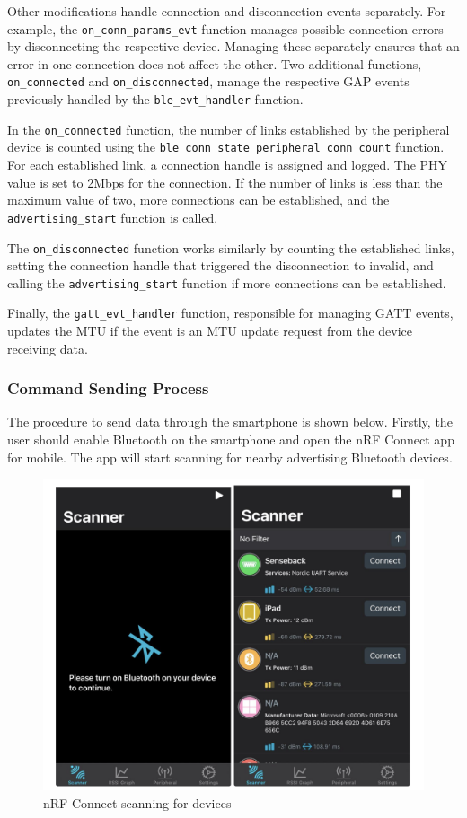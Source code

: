 \documentclass{Configuration_Files/PoliMi3i_thesis}
\begin{document}
Other modifications handle connection and disconnection events separately. For example, the \texttt{on\_conn\_params\_evt} function manages possible connection errors by disconnecting the respective device. Managing these separately ensures that an error in one connection does not affect the other. Two additional functions, \texttt{on\_connected} and \texttt{on\_disconnected}, manage the respective GAP events previously handled by the \texttt{ble\_evt\_handler} function.

In the \texttt{on\_connected} function, the number of links established by the peripheral device is counted using the \texttt{ble\_conn\_state\_peripheral\_conn\_count} function. For each established link, a connection handle is assigned and logged. The PHY value is set to 2Mbps for the connection. If the number of links is less than the maximum value of two, more connections can be established, and the \texttt{advertising\_start} function is called.

The \texttt{on\_disconnected} function works similarly by counting the established links, setting the connection handle that triggered the disconnection to invalid, and calling the \texttt{advertising\_start} function if more connections can be established.

Finally, the \texttt{gatt\_evt\_handler} function, responsible for managing GATT events, updates the MTU if the event is an MTU update request from the device receiving data.

\subsubsection{Command Sending Process}
The procedure to send data through the smartphone is shown below. Firstly, the user should enable Bluetooth on the smartphone and open the nRF Connect app for mobile. The app will start scanning for nearby advertising Bluetooth devices.

\begin{figure}[H]
    \centering
    \includegraphics[scale=0.6]{Multicentral/6.png}
    \caption{nRF Connect scanning for devices}
    \label{multicentral_6}
\end{figure}
\end{document}
